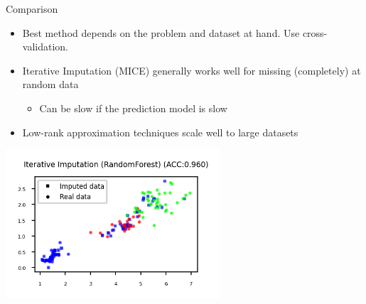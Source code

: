 \begin{frame}{Comparison}

\begin{itemize}
    \item Best method depends on the problem and dataset at hand. Use cross-validation.
    \item Iterative Imputation (MICE) generally works well for missing (completely) at random data
    \begin{itemize}
        \item Can be slow if the prediction model is slow
    \end{itemize}
    \item Low-rank approximation techniques scale well to large datasets
\end{itemize}

\vspace{1em}

\begin{center}
    \includegraphics[width=0.6\textwidth]{images/pre-processing/iterative-imputation.png}
\end{center}

\end{frame}



